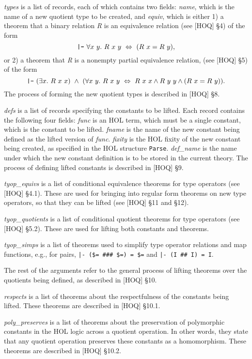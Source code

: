 {\it types\/} is a list of records, each of which contains two fields:
{\it name}, which is the name of a new quotient type to be created, and
{\it equiv}, which is
either 1)
a theorem that a binary relation {\it R\/}
is an equivalence relation
(see [HOQ] \S 4)
of the form
$$
\mbox{\tt |-}\
\forall x\ y.\ R\ x\ y \ \Leftrightarrow \
                (R\ x = R\ y),
$$
or 2)
a theorem that {\it R\/} is a nonempty partial equivalence relation,
(see [HOQ] \S 5)
of the form
$$
\mbox{\tt |-}\
(\exists x.\ R\ x\ x) \ \wedge \
(\forall x\ y.\ R\ x\ y \ \Leftrightarrow \
                R\ x\ x \wedge R\ y\ y \wedge (R\ x = R\ y)).
$$
The process of forming the new quotient types is described
in [HOQ] \S 8.

{\it defs\/} is a list of records specifying the constants to be lifted.
Each record contains the following four fields:
{\it func\/} is an HOL term, which must be a single constant, which is the
constant to be lifted.
{\it fname\/} is the name of the new constant being defined as the lifted version of {\it func}.
{\it fixity\/} is the HOL fixity of the new constant being created,
as specified in the HOL structure {\tt Parse}.
{\it def\_name} is the name under which the new constant definition is to
be stored in the current theory.
The
process of defining lifted constants
is described in [HOQ] \S 9.

{\it tyop\_equivs\/} is a list of conditional equivalence theorems
for type operators (see [HOQ] \S 4.1).
These are used for bringing into regular form
theorems on new type operators, so that they can be lifted
(see [HOQ] \S 11 and \S 12).

{\it tyop\_quotients\/} is a list of conditional quotient theorems
for type operators (see [HOQ] \S 5.2).
These are used for lifting both constants and theorems.

{\it tyop\_simps\/} is a list of theorems used to simplify type operator
relations and map functions, e.g.,
for pairs,
{\tt |- (\$= \#\#\# \$=) = \$=} and
{\tt |- (I \#\# I) = I}.

The rest of the arguments refer to the general process of lifting theorems
over the quotients being defined,
as described in [HOQ] \S 10.

{\it respects\/} is a list of theorems about the respectfulness of the
constants being lifted.
These theorems are described in
[HOQ] \S 10.1.

{\it poly\_preserves\/} is a list of theorems about the preservation of
polymorphic constants in the HOL logic
across a quotient operation.
In other words, they state that any quotient operation preserves these
constants as a homomorphism.
These theorems are described in
[HOQ] \S 10.2.

